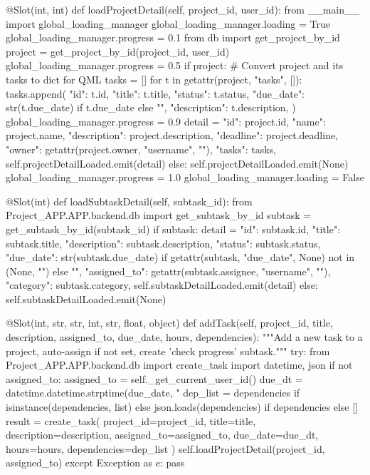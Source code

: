 \documentclass{report}
\begin{document}
\begin{python}
    @Slot(int, int)
    def loadProjectDetail(self, project_id, user_id):
        from __main__ import global_loading_manager
        global_loading_manager.loading = True
        global_loading_manager.progress = 0.1
        from db import get_project_by_id
        project = get_project_by_id(project_id, user_id)
        global_loading_manager.progress = 0.5
        if project:
            # Convert project and its tasks to dict for QML
            tasks = []
            for t in getattr(project, "tasks", []):
                tasks.append({
                    "id": t.id,
                    "title": t.title,
                    "status": t.status,
                    "due_date": str(t.due_date) if t.due_date else "",
                    "description": t.description,
                })
            global_loading_manager.progress = 0.9
            detail = {
                "id": project.id,
                "name": project.name,
                "description": project.description,
                "deadline": project.deadline,
                "owner": getattr(project.owner, "username", ""),
                "tasks": tasks,
            }
            self.projectDetailLoaded.emit(detail)
        else:
            self.projectDetailLoaded.emit(None)
        global_loading_manager.progress = 1.0
        global_loading_manager.loading = False

    @Slot(int)
    def loadSubtaskDetail(self, subtask_id):
        from Project_APP.APP.backend.db import get_subtask_by_id
        subtask = get_subtask_by_id(subtask_id)
        if subtask:
            detail = {
                "id": subtask.id,
                "title": subtask.title,
                "description": subtask.description,
                "status": subtask.status,
                "due_date": str(subtask.due_date) if getattr(subtask, "due_date", None) not in (None, "") else "",
                "assigned_to": getattr(subtask.assignee, "username", ""),
                "category": subtask.category,
            }
            self.subtaskDetailLoaded.emit(detail)
        else:
            self.subtaskDetailLoaded.emit(None)

    @Slot(int, str, str, int, str, float, object)
    def addTask(self, project_id, title, description, assigned_to, due_date, hours, dependencies):
        """Add a new task to a project, auto-assign if not set, create 'check progress' subtask."""
        try:
            from Project_APP.APP.backend.db import create_task
            import datetime, json
            if not assigned_to:
                assigned_to = self._get_current_user_id()
            due_dt = datetime.datetime.strptime(due_date, "%
            dep_list = dependencies if isinstance(dependencies, list) else json.loads(dependencies) if dependencies else []
            result = create_task(
                project_id=project_id,
                title=title,
                description=description,
                assigned_to=assigned_to,
                due_date=due_dt,
                hours=hours,
                dependencies=dep_list
            )
            self.loadProjectDetail(project_id, assigned_to)
        except Exception as e:
            pass


\end{python}
\end{document}
